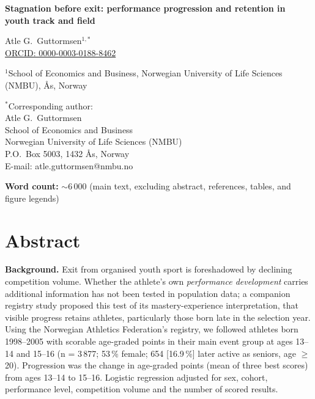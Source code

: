 \documentclass[12pt,a4paper]{article}
\begin{document}

\begin{titlepage}
\vspace*{2cm}

{\noindent\LARGE\bfseries Stagnation before exit: performance progression and retention in youth track and field\par}

\vspace{1.5cm}

{\noindent\large
Atle G.\ Guttormsen$^{1,*}$ \\
\href{https://orcid.org/0000-0003-0188-8462}{ORCID: 0000-0003-0188-8462}
}

\vspace{0.8cm}

{\noindent
$^1$School of Economics and Business, Norwegian University of Life Sciences (NMBU), Ås, Norway
}

\vspace{0.8cm}

{\noindent
$^*$Corresponding author:\\
Atle G.\ Guttormsen\\
School of Economics and Business\\
Norwegian University of Life Sciences (NMBU)\\
P.O.\ Box 5003, 1432 Ås, Norway\\
E-mail: atle.guttormsen@nmbu.no
}

\vspace{1.5cm}

{\noindent\textbf{Word count:} $\sim$6\,000 (main text, excluding abstract, references, tables, and figure legends)}

\end{titlepage}


\newpage
\section*{Abstract}

\noindent\textbf{Background.} Exit from organised youth sport is foreshadowed by declining competition volume. Whether the athlete's own \emph{performance development} carries additional information has not been tested in population data; a companion registry study proposed this test of its mastery-experience interpretation, that visible progress retains athletes, particularly those born late in the selection year. Using the Norwegian Athletics Federation's registry, we followed athletes born 1998--2005 with scorable age-graded points in their main event group at ages 13--14 and 15--16 (n = 3\,877; 53\,\% female; 654 [16.9\,\%] later active as seniors, age $\geq$20). Progression was the change in age-graded points (mean of three best scores) from ages 13--14 to 15--16. Logistic regression adjusted for sex, cohort, performance level, competition volume and the number of scored results.
\end{document}
